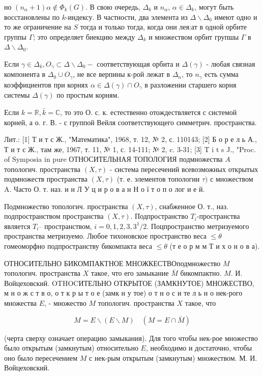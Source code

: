 \documentclass[10pt]{article}
\begin{document}
но $\left(n_{\alpha}+1\right) \alpha \notin \Phi_{k}(G)$. В свою очередь, $\Delta_{k}$ и $n_{\alpha}$, $\alpha \in \Delta_{k}$, могут быть восстановлены по $k$-индексу. В частности, два элемента из $\Delta \backslash \Delta_{0}$ имеют одно и то же ограничение на $S$ тогда и только тогда, когда они лея:ат в одной орбите группы $\Gamma$; это определяет биекцию между $\Delta_{k}$ и множеством орбит групшы $\Gamma$ в $\Delta \backslash \Delta_{0}$.

Если $\gamma \in \Delta_{k}, O_{\gamma} \subset \Delta \backslash \Delta_{0}-$ соответствующая орбита и $\Delta(\gamma)$ - любая связная компонента в $\Delta_{0} \cup O_{\gamma}$, не все верпины к-рой лежат в $\Delta_{n}$, то $n_{\gamma}$ есть сумма коэффициентов при корнях $\alpha \in \Delta(\gamma) \cap O_{\gamma}$ в разложении старшего корня системы $\Delta(\gamma)$ по простым корням.

Если $k=\mathbb{R}, \bar{k}=\mathbb{C}$, то это О. с. к. естественно отождествляется с системой корней, а о. г. В. - с группой Вейля соответствующего симметрич. пространства.

Лит.: [1] Т и т с Ж., "Математика", 1968, т. 12, № 2, с. 110143; [2] Б о р е л ь А., Т и т с Ж., там же, 1967, т. 11, № 1, с. 14-111; № 2, c. 3-31; [3] T i t s J., "Proc. of Symposia in pure ОТНОСИТЕЛЬНАЯ ТОПОЛОГИЯ подмножества $A$ топологич. пространства $(X, \tau)$ - система пересечений всевозможных открытых подмножеств пространства $(X, \tau)$ (т. е. элементов топологии $\tau)$ с множеством A. Часто О. т. наз. и н Л У ц и р о в а н Н о ї т о п о лог и е й.

Подмножество топологич. пространства $(X, \tau)$, снабженное О. т., наз. подпространством пространства $(X, \tau)$. Подпространство $T_{i}$-пространства является $T_{i^{-}}$ пространством, $i=0,1,2,3,3^{1} / 2$. Поцпространство метризуемого пространства метризуемо. Любое тихоновское пространство веса $\leqslant \theta$ гомеоморфно подпространству бикомпакта веса $\leqslant \theta$ (т е о р м м Т и х о н о в а).

ОТНОСИТЕЛЬНО БИКОМПАКТНОЕ МНОЖКЕСТВОподмножество $M$ топологич. пространства $X$ такое, что его замыкание $\bar{M}$ бикомпактно. $M$. И. Войцеховский. OTHOCИТЕЛЬНО ОТКРЫТОЕ (ЗАМКНУТОЕ) МНОЖЕСТВО, м н о ж с т в о, о т к р ы т о е (замк н у тое) о т н о с и те л ь н о нек-рого множества $E$, - множество $M$ топологич. пространства $X$ такое, что

\[
M=E \backslash(E \backslash M) \quad(M=E \cap \bar{M})
\]

(черта сверху означает операцию замыкания). Для того чтобы нек-рое множество было открытым (замкнутым) относительно $E$, необходимо и достаточно, чтобы оно было пересечением $M$ с нек-рым открытым (замкнутым) множеством. М. И. Войцеховский.
\end{document}
